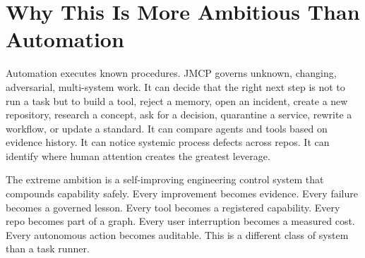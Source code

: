 \documentclass[10pt,journal,onecolumn]{IEEEtran}
\begin{document}
\section{Why This Is More Ambitious Than Automation}
Automation executes known procedures. JMCP governs unknown, changing, adversarial, multi-system work. It can decide that the right next step is not to run a task but to build a tool, reject a memory, open an incident, create a new repository, research a concept, ask for a decision, quarantine a service, rewrite a workflow, or update a standard. It can compare agents and tools based on evidence history. It can notice systemic process defects across repos. It can identify where human attention creates the greatest leverage.

The extreme ambition is a self-improving engineering control system that compounds capability safely. Every improvement becomes evidence. Every failure becomes a governed lesson. Every tool becomes a registered capability. Every repo becomes part of a graph. Every user interruption becomes a measured cost. Every autonomous action becomes auditable. This is a different class of system than a task runner.
\end{document}
